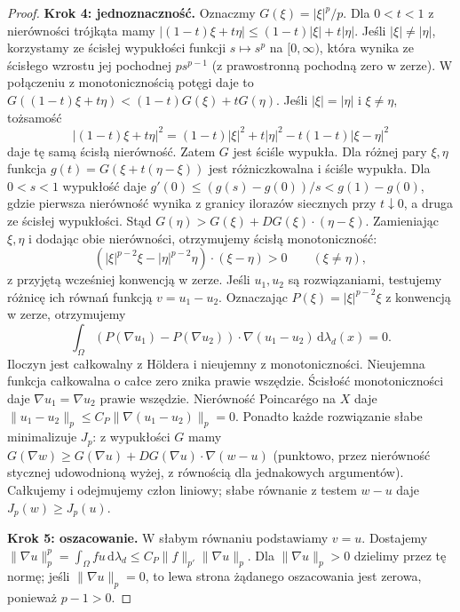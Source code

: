 \begin{proof}
\textbf{Krok 4: jednoznaczność.}
Oznaczmy $G(\xi)=|\xi|^p/p$.
Dla $0<t<1$ z nierówności trójkąta mamy
$|(1-t)\xi+t\eta|\le (1-t)|\xi|+t|\eta|$.
Jeśli $|\xi|\ne|\eta|$, korzystamy ze ścisłej
wypukłości funkcji $s\mapsto s^p$ na $[0,\infty)$,
która wynika ze ścisłego wzrostu jej pochodnej
$p s^{p-1}$ (z prawostronną pochodną zero w zerze).
W połączeniu z monotonicznością potęgi daje to
$G((1-t)\xi+t\eta)<(1-t)G(\xi)+tG(\eta)$.
Jeśli $|\xi|=|\eta|$ i $\xi\ne\eta$, tożsamość
\[
 |(1-t)\xi+t\eta|^2
 =(1-t)|\xi|^2+t|\eta|^2-t(1-t)|\xi-\eta|^2
\]
daje tę samą ścisłą nierówność.
Zatem $G$ jest ściśle wypukła. Dla różnej pary
$\xi,\eta$ funkcja $g(t)=G(\xi+t(\eta-\xi))$
jest różniczkowalna i ściśle wypukła.
Dla $0<s<1$ wypukłość daje
$g'(0)\le(g(s)-g(0))/s<g(1)-g(0)$,
gdzie pierwsza nierówność wynika z granicy
ilorazów siecznych przy $t\downarrow0$,
a druga ze ścisłej wypukłości.
Stąd $G(\eta)>G(\xi)+DG(\xi)\cdot(\eta-\xi)$.
Zamieniając $\xi,\eta$ i dodając obie nierówności,
otrzymujemy ścisłą monotoniczność:
\[
 (|\xi|^{p-2}\xi-|\eta|^{p-2}\eta)\cdot(\xi-\eta)>0
 \qquad(\xi\ne\eta),
\]
z przyjętą wcześniej konwencją w zerze. Jeśli $u_1,u_2$ są rozwiązaniami,
testujemy różnicę ich równań funkcją $v=u_1-u_2$.
Oznaczając $P(\xi)=|\xi|^{p-2}\xi$ z konwencją w zerze,
otrzymujemy
\[
 \int_\Omega
 (P(\nabla u_1)-P(\nabla u_2))\cdot\nabla(u_1-u_2)
 \,\mathrm d\lambda_d(x)=0.
\]
Iloczyn jest całkowalny z Höldera i nieujemny
z monotoniczności.
Nieujemna funkcja całkowalna o całce zero znika
prawie wszędzie. Ścisłość monotoniczności daje
$\nabla u_1=\nabla u_2$ prawie wszędzie.
Nierówność Poincarégo na $X$ daje
$\|u_1-u_2\|_p\le C_P\|\nabla(u_1-u_2)\|_p=0$.
Ponadto każde rozwiązanie słabe minimalizuje $J_p$:
z wypukłości $G$ mamy
$G(\nabla w)\ge G(\nabla u)+DG(\nabla u)\cdot\nabla(w-u)$
(punktowo, przez nierówność stycznej udowodnioną wyżej,
z równością dla jednakowych argumentów).
Całkujemy i odejmujemy człon liniowy; słabe
równanie z testem $w-u$ daje $J_p(w)\ge J_p(u)$.

\textbf{Krok 5: oszacowanie.}
W słabym równaniu podstawiamy $v=u$.
Dostajemy $\|\nabla u\|_p^p=\int_\Omega fu
\,\mathrm d\lambda_d\le C_P\|f\|_{p'}\|\nabla u\|_p$.
Dla $\|\nabla u\|_p>0$ dzielimy przez tę normę;
jeśli $\|\nabla u\|_p=0$, to lewa strona żądanego
oszacowania jest zerowa, ponieważ $p-1>0$.
\end{proof}

